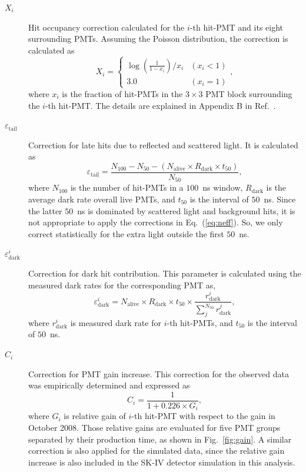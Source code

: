 \documentclass[aps,prd,reprint,superscriptaddress,floatfix,altaffilletter,nofootinbib]{revtex4-2}
\begin{document}
\begin{description}

\item[$X_i$]
Hit occupancy correction calculated for the $i$-th hit-PMT and its eight surrounding PMTs. 
Assuming the Poisson distribution, the correction is calculated as
\begin{equation}
    X_{i} = 
    \begin{cases}
\log \left(\frac{1}{1-x_{i}} \right)/{x_{i}} & (x_{i} < 1) \\ 
        3.0 & (x_{i} = 1) 
    \end{cases},
\end{equation}
where $x_{i}$ is the fraction of hit-PMTs in the $3 \times 3$ PMT block surrounding the $i$-th hit-PMT. 
The details are explained in Appendix B in Ref.~\cite{Koshio:1998}.

\item[$\varepsilon_{\mathrm{tail}}$] 
Correction for late hits due to reflected and scattered light. 
It is calculated as
\begin{equation}
    \varepsilon_{\mathrm{tail}} = \frac{N_{100} - N_{50} - \left(N_{\mathrm{alive}} \times R_{\mathrm{dark}} \times t_{50}\right)}{N_{50}},
\end{equation}
where $N_{100}$ is the number of hit-PMTs in a $100$~ns window, $R_\mathrm{dark}$ is the average dark rate overall live PMTs, and $t_{50}$ is the interval of $50$~ns. 
Since the latter $50$~ns is dominated by scattered light and background hits, it is not appropriate to apply the corrections in Eq.~(\ref{eq:neff}). 
So, we only correct statistically for the extra light outside the first $50$~ns.

\item[$\varepsilon^{i}_{\mathrm{dark}}$] 
Correction for dark hit contribution. This parameter is calculated using the measured dark rates for the corresponding PMT as,
\begin{equation}
  \varepsilon^{i}_{\mathrm{dark}} = N_{\mathrm{alive}} \times R_{\mathrm{dark}} \times t_{50}
  \times \frac{r^{i}_{\mathrm{dark}}}{\sum_{j}^{N_{50}}r^{j}_{\mathrm{dark}}},
\end{equation}
where $r^{i}_{\mathrm{dark}}$ is measured dark rate for $i$-th hit-PMTs, and $t_{50}$ is the interval of $50$~ns.

\item[$C_i$]
Correction for PMT gain increase. This correction for the observed data was empirically determined and expressed as 
\begin{equation}
C_i = \frac{1}{1 + 0.226 \times G_{i}},
\end{equation}
where $G_{i}$ is relative gain of $i$-th hit-PMT with respect to the gain in October 2008. 
Those relative gains are evaluated for five PMT groups separated by their production time, as shown in Fig.~\ref{fig:gain}. 
A similar correction is also applied for the simulated data, since the relative gain increase is also included in the SK-IV detector simulation in this analysis.


\end{description}
\end{document}
